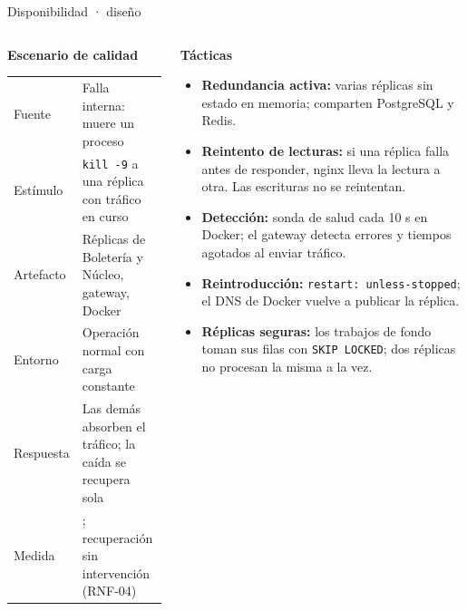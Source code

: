 \begin{frame}{Disponibilidad · diseño}
\footnotesize
\begin{columns}[T]
\begin{column}{0.47\textwidth}
\textbf{Escenario de calidad}\\[0.3em]
\begin{tabular}{@{}L{1.7cm}L{4.6cm}@{}}
Fuente & Falla interna: muere un proceso\\
Estímulo & \texttt{kill -9} a una réplica con tráfico en curso\\
Artefacto & Réplicas de Boletería y Núcleo, gateway, Docker\\
Entorno & Operación normal con carga constante\\
Respuesta & Las demás absorben el tráfico; la caída se recupera sola\\
Medida & \leavevmode{}; recuperación  sin intervención (RNF-04)\\
\end{tabular}
\end{column}
\begin{column}{0.5\textwidth}
\textbf{Tácticas}\\[0.3em]
\begin{itemize}\setlength\itemsep{0.3em}
\item \textbf{Redundancia activa:} varias réplicas sin estado en memoria; comparten PostgreSQL y Redis.
\item \textbf{Reintento de lecturas:} si una réplica falla antes de responder, nginx lleva la lectura a
otra. Las escrituras no se reintentan.
\item \textbf{Detección:} sonda de salud cada 10 s en Docker; el gateway detecta errores y tiempos
agotados al enviar tráfico.
\item \textbf{Reintroducción:} \texttt{restart: unless-stopped}; el DNS de Docker vuelve a publicar
la réplica.
\item \textbf{Réplicas seguras:} los trabajos de fondo toman sus filas con \texttt{SKIP LOCKED}; dos
réplicas no procesan la misma a la vez.
\end{itemize}
\end{column}
\end{columns}
\end{frame}

